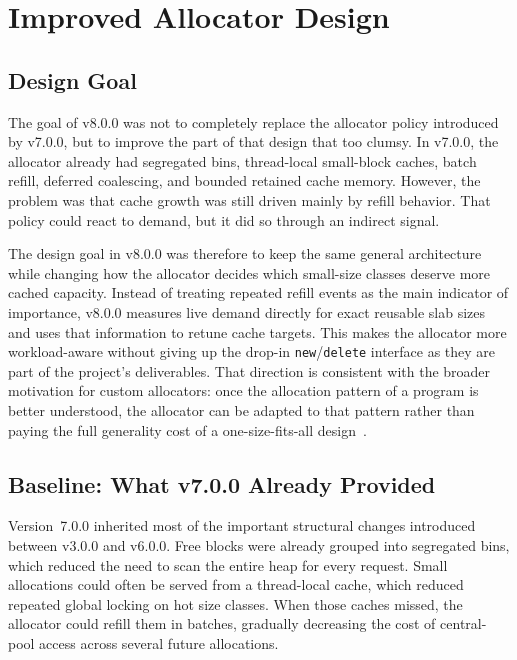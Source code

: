 \section{Improved Allocator Design}
\label{sec:improved-design}

\subsection{Design Goal}

The goal of v8.0.0 was not to completely replace the allocator policy introduced by v7.0.0, but to improve
the part of that design that too clumsy. In v7.0.0, the allocator already had segregated bins, thread-local
small-block caches, batch refill, deferred coalescing, and bounded retained cache memory. However, the problem
was that cache growth was still driven mainly by refill behavior. That policy could react to demand,
but it did so through an indirect signal.

The design goal in v8.0.0 was therefore to keep the same general architecture while changing how
the allocator decides which small-size classes deserve more cached capacity. Instead of treating repeated
refill events as the main indicator of importance, v8.0.0 measures live demand directly for exact reusable
slab sizes and uses that information to retune cache targets. This makes the allocator more workload-aware
without giving up the drop-in \texttt{new}/\texttt{delete} interface as they are part of the project's
deliverables. That direction is consistent with the broader motivation for custom allocators: once the
allocation pattern of a program is better understood, the allocator can be adapted to that pattern rather
than paying the full generality cost of a one-size-fits-all design~\cite{rakosCustomAllocators2021}.

\subsection{Baseline: What v7.0.0 Already Provided}

Version~7.0.0 inherited most of the important structural changes introduced between v3.0.0 and v6.0.0. Free
blocks were already grouped into segregated bins, which reduced the need to scan the entire heap for every
request. Small allocations could often be served from a thread-local cache, which reduced repeated global
locking on hot size classes. When those caches missed, the allocator could refill them in batches, gradually
decreasing the cost of central-pool access across several future allocations.

